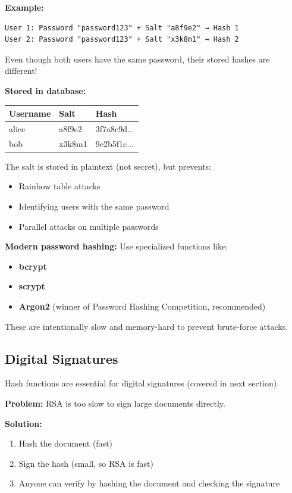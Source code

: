 \documentclass[11pt,a4paper]{report}
\begin{document}
\textbf{Example:}
\begin{verbatim}
User 1: Password "password123" + Salt "a8f9e2" → Hash 1
User 2: Password "password123" + Salt "x3k8m1" → Hash 2
\end{verbatim}

Even though both users have the same password, their stored hashes are different!

\textbf{Stored in database:}
\begin{center}
\begin{tabular}{|l|l|l|}
\hline
\textbf{Username} & \textbf{Salt} & \textbf{Hash} \\
\hline
alice & a8f9e2 & 3f7a8c9d... \\
bob & x3k8m1 & 9e2b5f1c... \\
\hline
\end{tabular}
\end{center}

The salt is stored in plaintext (not secret), but prevents:
\begin{itemize}
\item Rainbow table attacks
\item Identifying users with the same password
\item Parallel attacks on multiple passwords
\end{itemize}

\textbf{Modern password hashing:} Use specialized functions like:
\begin{itemize}
\item \textbf{bcrypt}
\item \textbf{scrypt}
\item \textbf{Argon2} (winner of Password Hashing Competition, recommended)
\end{itemize}

These are intentionally slow and memory-hard to prevent brute-force attacks.

\subsection{Digital Signatures}

Hash functions are essential for digital signatures (covered in next section).

\textbf{Problem:} RSA is too slow to sign large documents directly.

\textbf{Solution:}
\begin{enumerate}
\item Hash the document (fast)
\item Sign the hash (small, so RSA is fast)
\item Anyone can verify by hashing the document and checking the signature
\end{enumerate}
\end{document}
